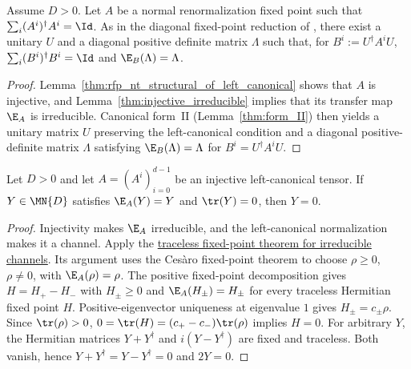\begin{lemma}%
    \label{thm:rfp_nt_cfii_diagonal_fixed_point}
    \leanok
    Assume $D > 0$. Let $A$ be a normal renormalization fixed point such that
    $\sum_i (A^i)^\dagger A^i = \Id$.
    As in the diagonal fixed-point reduction of
    \cite[Appendix~B]{Cirac2016MPDO_arXiv}, there exist a unitary $U$ and a
    diagonal positive definite matrix $\Lambda$ such that, for
    $B^i := U^\dagger A^i U$, $\sum_i (B^i)^\dagger B^i = \Id$ and
    $\E_B(\Lambda) = \Lambda$.
\end{lemma}
\begin{proof}\leanok
    Lemma~\ref{thm:rfp_nt_structural_of_left_canonical} shows that $A$ is
    injective, and Lemma~\ref{thm:injective_irreducible} implies that its
    transfer map $\E_A$ is irreducible. Canonical form~II
    (Lemma~\ref{thm:form_II}) then yields a unitary matrix $U$ preserving the
    left-canonical condition and a diagonal positive-definite matrix $\Lambda$
    satisfying $\E_B(\Lambda) = \Lambda$ for $B^i = U^\dagger A^i U$.
\end{proof}

\begin{lemma}
    \label{lem:rfp_injective_traceless_fixed_point}
    \leanok
    Let $D>0$ and let $A=(A^i)_{i=0}^{d-1}$ be an injective
    left-canonical tensor. If $Y\in\MN{D}$ satisfies
    $\E_A(Y)=Y$ and $\tr(Y)=0$, then $Y=0$.
\end{lemma}
\begin{proof}\leanok
    Injectivity makes $\E_A$ irreducible, and the left-canonical
    normalization makes it a channel. Apply the
    \href{https://github.com/LionSR/QICLean/blob/603fc408b9f4c2a50f2475e1e44843fdc0a9c0ac/QICLean/Channel/Peripheral/IrreducibleChannel.lean#L100}{%
        traceless fixed-point theorem for irreducible channels}.
    Its argument uses the Cesàro fixed-point theorem
    \cite[Cesàro fixed-point theorem]{QICLean2026Blueprint} to choose
    $\rho\geq0$, $\rho\neq0$, with $\E_A(\rho)=\rho$.
    The positive fixed-point decomposition
    \cite[Positive fixed-point decomposition]{QICLean2026Blueprint}
    gives $H=H_+-H_-$ with $H_\pm\geq0$ and $\E_A(H_\pm)=H_\pm$
    for every traceless Hermitian fixed point $H$.
    Positive-eigenvector uniqueness at eigenvalue $1$
    \cite[PSD eigenvector uniqueness for irreducible CP maps]{QICLean2026Blueprint}
    gives $H_\pm=c_\pm\rho$. Since $\tr(\rho)>0$,
    $0=\tr(H)=(c_+-c_-)\tr(\rho)$ implies $H=0$.
    For arbitrary $Y$, the Hermitian matrices $Y+Y^\dagger$ and
    $i(Y-Y^\dagger)$ are fixed and traceless. Both vanish, hence
    $Y+Y^\dagger=Y-Y^\dagger=0$ and $2Y=0$.
\end{proof}

